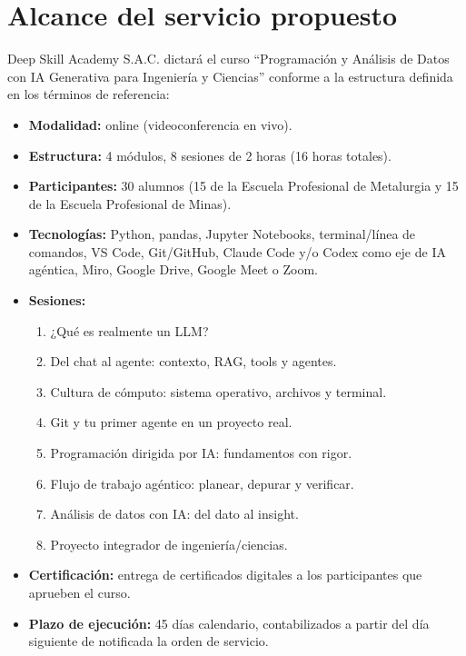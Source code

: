 \section{Alcance del servicio propuesto}

Deep Skill Academy S.A.C. dictará el curso ``Programación y Análisis de Datos con IA Generativa para Ingeniería y Ciencias'' conforme a la estructura definida en los términos de referencia:

\begin{itemize}[leftmargin=1.5em]
  \item \textbf{Modalidad:} online (videoconferencia en vivo).
  \item \textbf{Estructura:} 4 módulos, 8 sesiones de 2 horas (16 horas totales).
  \item \textbf{Participantes:} 30 alumnos (15 de la Escuela Profesional de Metalurgia y 15 de la Escuela Profesional de Minas).
  \item \textbf{Tecnologías:} Python, pandas, Jupyter Notebooks, terminal/línea de comandos, VS Code, Git/GitHub, Claude Code y/o Codex como eje de IA agéntica, Miro, Google Drive, Google Meet o Zoom.
  \item \textbf{Sesiones:}
  \begin{enumerate}[leftmargin=2.5em, nosep]
    \item ¿Qué es realmente un LLM?
    \item Del chat al agente: contexto, RAG, tools y agentes.
    \item Cultura de cómputo: sistema operativo, archivos y terminal.
    \item Git y tu primer agente en un proyecto real.
    \item Programación dirigida por IA: fundamentos con rigor.
    \item Flujo de trabajo agéntico: planear, depurar y verificar.
    \item Análisis de datos con IA: del dato al insight.
    \item Proyecto integrador de ingeniería/ciencias.
  \end{enumerate}
  \item \textbf{Certificación:} entrega de certificados digitales a los participantes que aprueben el curso.
  \item \textbf{Plazo de ejecución:} 45 días calendario, contabilizados a partir del día siguiente de notificada la orden de servicio.
\end{itemize}

